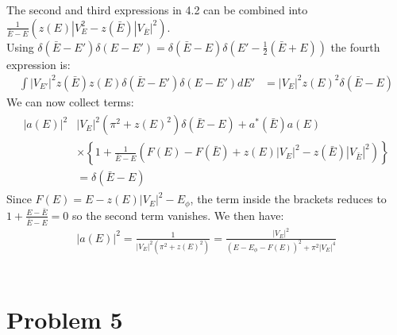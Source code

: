 \documentclass[a4paper,11pt]{article}
\numberwithin{equation}{section}
\newcommand{\pp}[1]{#1'}
\begin{document}
The second and third expressions in 4.2 can be combined into $\frac{1}{\bar{E}-E}\left(z(E)|V_E^2-z(\bar{E})|V_{\bar{E}}|^2 \right)$.
\\
Using $\delta(\bar{E}-\pp{E})\delta(E-\pp{E})=\delta(\bar{E}-E)\delta(\pp{E}-\frac{1}{2}(\bar{E}+E))$ the fourth expression is:
\begin{align}
 \int |V_{\pp{E}}|^2 z(\bar{E})z(E)\delta(\bar{E}-\pp{E})\delta(E-\pp{E}) d\pp{E} &= |V_{E}|^2 z(E)^2\delta(\bar{E}-E)
\end{align}
We can now collect terms:
\begin{align}
 \begin{split}
  |a(E)|^2&|V_E|^2(\pi^2+z(E)^2)\delta(\bar{E}-E)+a^*(\bar{E})a(E)\\
      &\times\left\{1+\frac{1}{\bar{E}-E}\left(F(E)-F(\bar{E})
         +z(E)|V_E|^2-z(\bar{E})|V_{\bar{E}}|^2  \right) \right\}\\
         &=\delta(\bar{E}-E)
 \end{split}
\end{align}
Since $F(E)=E-z(E)|V_E|^2-E_\phi$, the term inside the brackets reduces to $1+\frac{E-\bar{E}}{\bar{E}-E}=0$ so the second term vanishes.
We then have:
\begin{align}
 |a(E)|^2 =\frac{1}{|V_E|^2(\pi^2+z(E)^2)}=\frac{|V_E|^2}{(E-E_\phi-F(E))^2+\pi^2|V_E|^4}
\end{align}
\\
\section{Problem 5}
\end{document}
